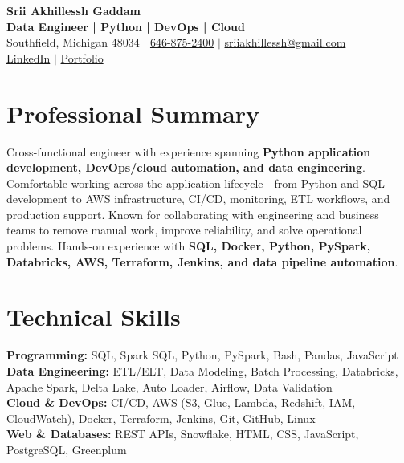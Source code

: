\documentclass[letterpaper,10pt]{article}
\begin{document}
\fontsize{9.35pt}{10.45pt}\selectfont

\begin{center}
    {\LARGE \textbf{Srii Akhillessh Gaddam}} \\[-1pt]
    \textbf{Data Engineer | Python | DevOps | Cloud} \\[2pt]
    Southfield, Michigan 48034 $|$
    \href{tel:6468752400}{646-875-2400} $|$
    \href{mailto:sriiakhillessh@gmail.com}{sriiakhillessh@gmail.com} \\[1pt]
    \href{https://www.linkedin.com/in/srii-akhiilessh-gaddam-b48668191/}{LinkedIn} $|$
    \href{https://sriiakhillesshg.github.io/portfolio/}{Portfolio}
\end{center}
\vspace{-8pt}

\section{Professional Summary}
\small{Cross-functional engineer with experience spanning \textbf{Python application development, DevOps/cloud automation, and data engineering}. Comfortable working across the application lifecycle - from Python and SQL development to AWS infrastructure, CI/CD, monitoring, ETL workflows, and production support. Known for collaborating with engineering and business teams to remove manual work, improve reliability, and solve operational problems. Hands-on experience with \textbf{SQL, Docker, Python, PySpark, Databricks, AWS, Terraform, Jenkins, and data pipeline automation}.}

\section{Technical Skills}
\small{
\textbf{Programming:} SQL, Spark SQL, Python, PySpark, Bash, Pandas, JavaScript \\
\textbf{Data Engineering:} ETL/ELT, Data Modeling, Batch Processing, Databricks, Apache Spark, Delta Lake, Auto Loader, Airflow, Data Validation \\
\textbf{Cloud \& DevOps:} CI/CD, AWS (S3, Glue, Lambda, Redshift, IAM, CloudWatch), Docker, Terraform, Jenkins, Git, GitHub, Linux \\
\textbf{Web \& Databases:} REST APIs, Snowflake, HTML, CSS, JavaScript, PostgreSQL, Greenplum
}
\end{document}
